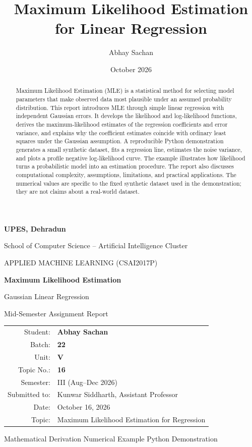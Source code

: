 \documentclass[11pt,a4paper]{article}
\title{Maximum Likelihood Estimation for Linear Regression}
\author{Abhay Sachan}
\date{October 2026}
\begin{document}
\begin{titlepage}
  \thispagestyle{empty}
  \centering
  \vspace*{1.0cm}
  {\Large\bfseries UPES, Dehradun\par}
  \vspace{0.25cm}
  {\large School of Computer Science -- Artificial Intelligence Cluster\par}
  \vspace{1.5cm}
  {\Large\color{navy}APPLIED MACHINE LEARNING (CSAI2017P)\par}
  \vspace{0.7cm}
  {\huge\bfseries Maximum Likelihood Estimation\par}
  \vspace{0.3cm}
  {\LARGE Gaussian Linear Regression\par}
  \vspace{1.2cm}
  {\large Mid-Semester Assignment Report\par}
  \vspace{1.0cm}
  \renewcommand{\arraystretch}{1.5}
  \begin{tabular}{rl}
    Student: & \textbf{Abhay Sachan}\\
    Batch: & \textbf{22}\\
    Unit: & \textbf{V}\\
    Topic No.: & \textbf{16}\\
    Semester: & III (Aug--Dec 2026)\\
    Submitted to: & Kunwar Siddharth, Assistant Professor\\
    Date: & October 16, 2026\\
    Topic: & Maximum Likelihood Estimation for Regression
  \end{tabular}
  \vfill
  {\large Mathematical Derivation \quad Numerical Example \quad Python Demonstration\par}
\end{titlepage}

\begin{abstract}
Maximum Likelihood Estimation (MLE) is a statistical method for selecting model parameters that make observed data most plausible under an assumed probability distribution. This report introduces MLE through simple linear regression with independent Gaussian errors. It develops the likelihood and log-likelihood functions, derives the maximum-likelihood estimates of the regression coefficients and error variance, and explains why the coefficient estimates coincide with ordinary least squares under the Gaussian assumption. A reproducible Python demonstration generates a small synthetic dataset, fits a regression line, estimates the noise variance, and plots a profile negative log-likelihood curve. The example illustrates how likelihood turns a probabilistic model into an estimation procedure. The report also discusses computational complexity, assumptions, limitations, and practical applications. The numerical values are specific to the fixed synthetic dataset used in the demonstration; they are not claims about a real-world dataset.
\end{abstract}
\end{document}
